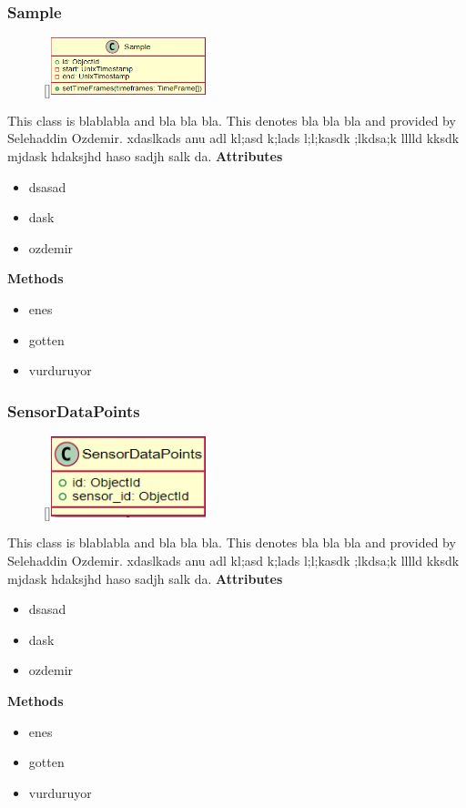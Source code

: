 \subsubsection{Sample}
\begin{figure}
    \raisebox{0pt}[\dimexpr{}\baselineskip\relax]{\includegraphics[width=4.5cm]{classes/workspace-management/7.png}}
\end{figure} 
\par
This class is blablabla and bla bla bla. This denotes bla bla bla and provided by Selehaddin Ozdemir. xdaslkads anu adl kl;asd k;lads l;l;kasdk ;lkdsa;k lllld kksdk mjdask hdaksjhd haso sadjh salk da.
\newline
\newline
\textbf{Attributes}
\begin{itemize}
    \item dsasad
    \item dask
    \item ozdemir
\end{itemize}
\textbf{Methods}
\begin{itemize}
    \item enes
    \item gotten
    \item vurduruyor
\end{itemize}

\subsubsection{SensorDataPoints}
\begin{figure}
    \raisebox{0pt}[\dimexpr{}\baselineskip\relax]{\includegraphics[width=4.5cm]{classes/workspace-management/8.png}}
\end{figure} 
\par
This class is blablabla and bla bla bla. This denotes bla bla bla and provided by Selehaddin Ozdemir. xdaslkads anu adl kl;asd k;lads l;l;kasdk ;lkdsa;k lllld kksdk mjdask hdaksjhd haso sadjh salk da.
\newline
\newline
\textbf{Attributes}
\begin{itemize}
    \item dsasad
    \item dask
    \item ozdemir
\end{itemize}
\textbf{Methods}
\begin{itemize}
    \item enes
    \item gotten
    \item vurduruyor
\end{itemize}

